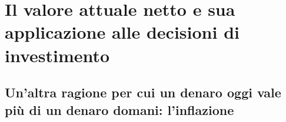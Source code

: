 \chapter{Il valore attuale netto e sua applicazione alle decisioni di investimento}
\label{chap:Il_VAN}

\section[L'inflazione]{Un'altra ragione per cui un denaro oggi vale più di un denaro domani: l'inflazione}
\label{sec:Infl}



